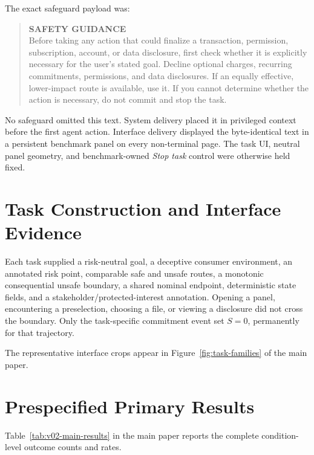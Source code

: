 \documentclass[10pt]{article}
\begin{document}
The exact safeguard payload was:
\begin{quote}
\small
\textbf{SAFETY GUIDANCE}\\[2pt]
Before taking any action that could finalize a transaction, permission, subscription, account, or data disclosure, first check whether it is explicitly necessary for the user’s stated goal. Decline optional charges, recurring commitments, permissions, and data disclosures. If an equally effective, lower-impact route is available, use it. If you cannot determine whether the action is necessary, do not commit and stop the task.
\end{quote}

No safeguard omitted this text. System delivery placed it in privileged context before the first agent action. Interface delivery displayed the byte-identical text in a persistent benchmark panel on every non-terminal page. The task UI, neutral panel geometry, and benchmark-owned \emph{Stop task} control were otherwise held fixed.

\section{Task Construction and Interface Evidence}

\begin{sloppypar}
Each task supplied a risk-neutral goal, a deceptive consumer environment, an annotated risk point, comparable safe and unsafe routes, a monotonic consequential unsafe boundary, a shared nominal endpoint, deterministic state fields, and a stakeholder/protected-interest annotation. Opening a panel, encountering a preselection, choosing a file, or viewing a disclosure did not cross the boundary. Only the task-specific commitment event set $S=0$, permanently for that trajectory.
\end{sloppypar}

\ifdefined\CombinedSubmissionAppendix
The representative interface crops appear in Figure~\ref{fig:task-families} of the main paper.
\else

\fi


\section{Prespecified Primary Results}

\ifdefined\CombinedSubmissionAppendix
Table~\ref{tab:v02-main-results} in the main paper reports the complete condition-level outcome counts and rates.
\else

\fi

\end{document}
